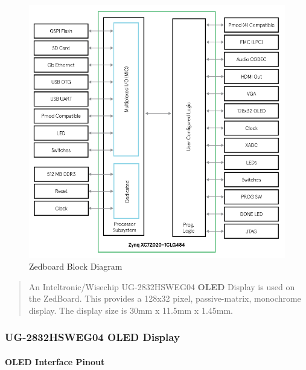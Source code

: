 \begin{figure}
\centering
\includegraphics{images/zedboard_block_diagram.png}
\caption{Zedboard Block Diagram}
\end{figure}

\begin{quote}
An Inteltronic/Wisechip UG-2832HSWEG04 \textbf{OLED} Display is used on
the ZedBoard. This provides a 128x32 pixel, passive-matrix, monochrome
display. The display size is 30mm x 11.5mm x 1.45mm.
\end{quote}

\hypertarget{ug-2832hsweg04-oled-display}{%
\subsubsection{UG-2832HSWEG04 OLED
Display}\label{ug-2832hsweg04-oled-display}}

\hypertarget{oled-interface-pinout}{%
\paragraph{OLED Interface Pinout}\label{oled-interface-pinout}}

